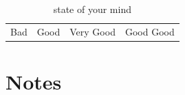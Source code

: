 \begin{table}[ht]
\caption{state of your mind}
\label{cluster_category}
\centering
\small
\begin{tabu} to \linewidth {|c|c|c|c|}
\hline
 &
 &
 &
\\
\hline
Bad & Good & Very Good & Good Good\\
\hline
\end{tabu}
\end{table}


\section*{Notes}
\begin{footnotesize}
\theendnotes
\end{footnotesize}
